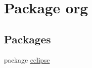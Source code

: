 \hypertarget{namespaceorg}{
\section{Package org}
\label{namespaceorg}
}
\subsection*{Packages}
\begin{DoxyCompactItemize}
\item 
package \hyperlink{namespaceorg_1_1eclipse}{eclipse}
\end{DoxyCompactItemize}
